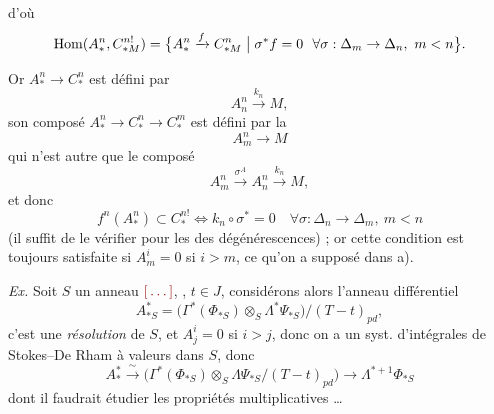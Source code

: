 \documentclass[11pt,a4paper]{article}
\begin{document}
d'où
\[
  \mathrm{Hom}(A^n_*, C^{n!}_{*M}) = \bigl\{ A^n_* \xrightarrow{f} C^n_{*M} \bigm|
  \sigma^* f = 0 \ \ \forall \sigma : \Delta_m \to \Delta_n,\ m < n \bigr\}.
\]


Or $A^n_* \to C^n_*$ est défini par
\[
  A^n_n \xrightarrow{k_n} M,
\]
son composé $A^n_* \to C^n_* \to C^m_*$ est défini par la
\[
  A^n_m \longrightarrow M
\]
qui n'est autre que le composé
\[
  A^n_m \xrightarrow{\sigma^A} A^n_n \xrightarrow{k_n} M,
\]
et  \ill{} donc
\[
  f^n(A^n_*) \subset C^{n!}_* \iff k_n \circ \sigma^* = 0 \quad
  \forall \sigma : \Delta_n \to \Delta_m,\ m < n
\]
(il suffit \ill{} de le vérifier pour les \ill{} des dégénérescences) ; or cette
condition est toujours satisfaite si $A^i_m = 0$ si $i > m$, ce qu'on a supposé dans a).

\emph{Ex.} Soit $S$ un anneau  $\ill{}$, , $t \in J$,
considérons alors l'anneau différentiel 
\[
  A^*_{*S} = \bigl(\Gamma^*(\Phi_{*S}) \otimes_S \Lambda^* \Psi_{*S}\bigr) / (T - t)_{pd},
\]
c'est une \emph{résolution} de $S$, et $A^i_j = 0$ si $i > j$, donc on a un syst.
d'intégrales de Stokes--De Rham à valeurs dans $S$, donc
\[
  A^*_* \xrightarrow{\;\sim\;} \bigl(\Gamma^*(\Phi_{*S}) \otimes_S \Lambda \Psi_{*S} / (T - t)_{pd}\bigr)
  \longrightarrow \Lambda^{*+1} \Phi_{*S}
\]
dont il faudrait étudier les propriétés multiplicatives \ldots{} \struck{\ill{}}
\end{document}
